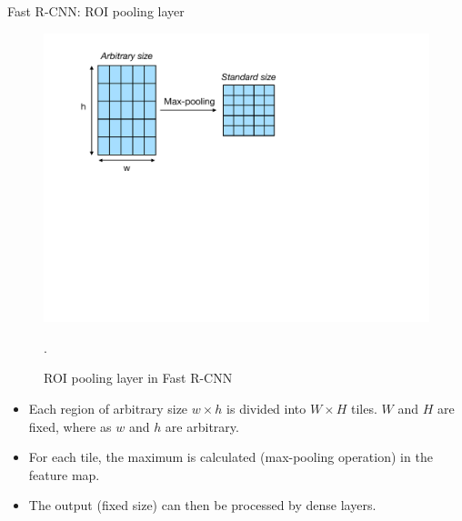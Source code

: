 \documentclass[xcolor=pdftex,dvipsnames,table]{beamer}
\begin{document}
\begin{frame}{Fast R-CNN: ROI pooling layer}
\begin{figure}[htb]
   \centering
   \includegraphics[height=0.4\textheight]{../graphics/ROI_pooling_layer.pdf}
   \caption{ROI pooling layer in Fast R-CNN}.
\end{figure}
\begin{itemize}
\item Each region of arbitrary size $w \times h$ is divided into $W \times H$ tiles. $W$ and $H$ are fixed, where as $w$ and $h$ are arbitrary.
\item For each tile, the maximum is calculated (max-pooling operation) in the feature map.
\item The output (fixed size) can then be processed by dense layers. 
\end{itemize}
\end{frame}
\end{document}
